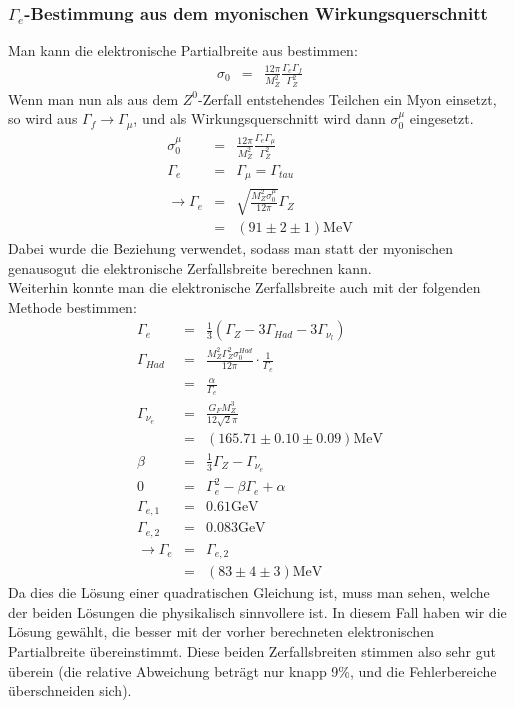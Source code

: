 \subsubsection{$\Gamma_e$-Bestimmung aus dem myonischen Wirkungsquerschnitt}
Man kann die elektronische Partialbreite aus \cite[Gl.5]{script} bestimmen:
\begin{eqnarray}
 \sigma_0 &=& \frac{12\pi}{M_Z^2}\frac{\Gamma_e\Gamma_f}{\Gamma_Z^2}
\end{eqnarray}
Wenn man nun als aus dem $Z^0$-Zerfall entstehendes Teilchen ein Myon einsetzt, so wird aus $\Gamma_f\rightarrow\Gamma_{\mu}$, und als Wirkungsquerschnitt wird dann $\sigma_0^{\mu}$ eingesetzt.
\begin{eqnarray}
\sigma_0^{\mu} &=& \frac{12\pi}{M_Z^2}\frac{\Gamma_e\Gamma_{\mu}}{\Gamma_Z^2}\\
 \Gamma_e &=& \Gamma_{\mu} = \Gamma_{tau}\\
 \rightarrow \Gamma_e &=& \sqrt{\frac{M_Z^2\sigma_0^{\mu}}{12\pi}}\Gamma_Z\\
 &=& (91 \pm 2 \pm 1)\si{\mega\electronvolt}
\end{eqnarray}
Dabei wurde die Beziehung \cite[Gl.9]{script} verwendet, sodass man statt der myonischen genausogut die elektronische Zerfallsbreite berechnen kann.\\
Weiterhin konnte man die elektronische Zerfallsbreite auch mit der folgenden Methode bestimmen:
\begin{eqnarray}
\Gamma_e &=& \frac{1}{3}(\Gamma_Z - 3\Gamma_{Had} - 3\Gamma_{\nu_l})\\
\Gamma_{Had} &=& \frac{M_Z^2\Gamma_Z^2\sigma_0^{Had}}{12\pi}\cdot\frac{1}{\Gamma_e}\\
&=& \frac{\alpha}{\Gamma_e}\\
\Gamma_{\nu_e} &=& \frac{G_FM_Z^3}{12\sqrt{2}\pi}\\
&=& (165.71 \pm 0.10 \pm 0.09)\si{\mega\electronvolt}\\
\beta &=& \frac{1}{3}\Gamma_Z - \Gamma_{\nu_e}\\
0 &=& \Gamma_e^2 - \beta\Gamma_e + \alpha\\
\Gamma_{e,1} &=& 0.61\si{\giga\electronvolt}\\
\Gamma_{e,2} &=& 0.083\si{\giga\electronvolt}\\
\rightarrow \Gamma_e &=& \Gamma_{e,2}\\
&=& (83 \pm 4 \pm 3) \si{\mega\electronvolt}
\end{eqnarray}
Da dies die Lösung einer quadratischen Gleichung ist, muss man sehen, welche der beiden Lösungen die physikalisch sinnvollere ist. In diesem Fall haben wir die Lösung gewählt, die besser mit der vorher berechneten elektronischen Partialbreite übereinstimmt. Diese beiden Zerfallsbreiten stimmen also sehr gut überein (die relative Abweichung beträgt nur knapp 9\si{\percent}, und die Fehlerbereiche überschneiden sich).

